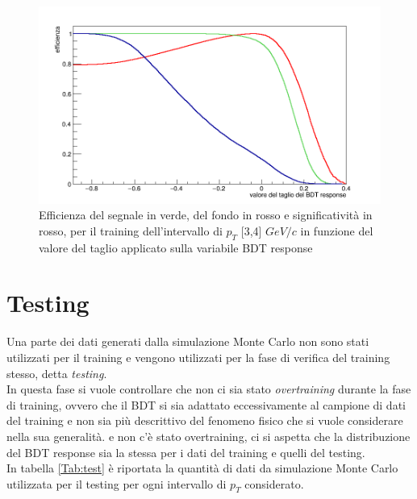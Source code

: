     \begin{figure}[htbp] 
        \centering
        \includegraphics[width=0.7\linewidth]{training&testing/eff_signok.png}
        \caption{Efficienza del segnale in verde, del fondo in rosso e significatività in rosso, per il training dell'intervallo di $p_T$ [3,4] $GeV/c$ in funzione del valore del taglio applicato sulla variabile BDT response}
        \label{fig:efficienza}
    \end{figure}



    



\section{Testing} \label{testing}
    Una parte dei dati generati dalla simulazione Monte Carlo non sono stati utilizzati per il training e vengono utilizzati per la fase di verifica del training stesso, detta \textit{testing}. 
    \\In questa fase si vuole controllare che non ci sia stato \textit{overtraining} durante la fase di training, ovvero che il BDT si sia adattato eccessivamente al campione di dati del training e non sia più descrittivo del fenomeno fisico che si vuole considerare nella  sua generalità. e non c'è stato overtraining, ci si aspetta che la distribuzione del BDT response sia la stessa per i dati del training e quelli del testing. 
    \\In tabella \ref{Tab:test} è riportata la quantità di dati da simulazione Monte Carlo utilizzata per il testing per ogni intervallo di $p_T$ considerato.
    
